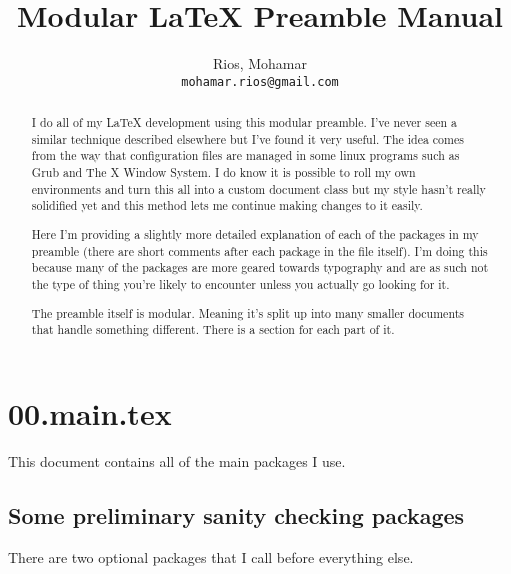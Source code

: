 \newcommand{\preamblefolder}{./include}       %

\usepackage[enable]{easy-todo}                %

\title{Modular \LaTeX{} Preamble Manual}
\author{
  Rios, Mohamar\\
  \texttt{mohamar.rios@gmail.com}
}


  \maketitle
  \tableofcontents
 
  \begin{abstract}
    I do all of my \LaTeX{} development using this modular preamble. I've never seen a similar technique described elsewhere but I've found it very useful. The idea comes from the way that configuration files are managed in some linux programs such as Grub and The X Window System. I do know it is possible to roll my own environments and turn this all into a custom document class but my style hasn't really solidified yet and this method lets me continue making changes to it easily.

    Here I'm providing a slightly more detailed explanation of each of the packages in my preamble (there are short comments after each package in the file itself). I'm doing this because many of the packages are more geared towards typography and are as such not the type of thing you're likely to encounter unless you actually go looking for it.

    The preamble itself is modular. Meaning it's split up into many smaller documents that handle something different. There is a section for each part of it.
  \end{abstract}
  
  \section{00.main.tex}\label{main}
    
    This document contains all of the main packages I use.

    \subsection{Some preliminary sanity checking packages}
      There are two optional packages that I call before everything else.

